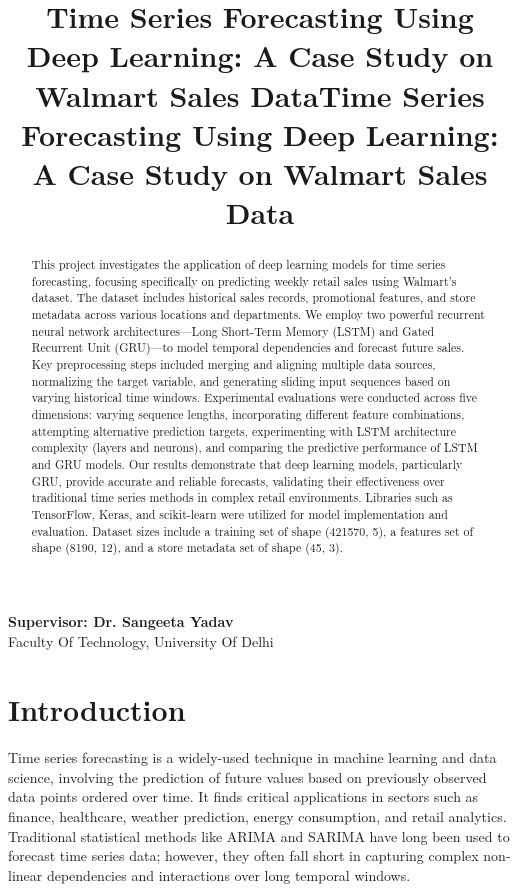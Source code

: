 \documentclass[conference]{IEEEtran}
\title{Time Series Forecasting Using Deep Learning: A Case Study on Walmart Sales Data}
\author{
\IEEEauthorblockN{
Tamanna Sharma,
Jenny Prasad,
Ashish Pal,
Piyush Takrani,
Khushdeep Singh,
Arham Khan}
}
\begin{document}
\maketitle  %

\vspace{1.5em}
\begin{center}
\textbf{Supervisor: Dr. Sangeeta Yadav}\\
Faculty Of Technology, University Of Delhi\\
\end{center}
\vspace{1em}

\title{Time Series Forecasting Using Deep Learning: A Case Study on Walmart Sales Data}





\begin{abstract}
This project investigates the application of deep learning models for time series forecasting, focusing specifically on predicting weekly retail sales using Walmart's dataset. The dataset includes historical sales records, promotional features, and store metadata across various locations and departments. We employ two powerful recurrent neural network architectures—Long Short-Term Memory (LSTM) and Gated Recurrent Unit (GRU)—to model temporal dependencies and forecast future sales. Key preprocessing steps included merging and aligning multiple data sources, normalizing the target variable, and generating sliding input sequences based on varying historical time windows. Experimental evaluations were conducted across five dimensions: varying sequence lengths, incorporating different feature combinations, attempting alternative prediction targets, experimenting with LSTM architecture complexity (layers and neurons), and comparing the predictive performance of LSTM and GRU models. Our results demonstrate that deep learning models, particularly GRU, provide accurate and reliable forecasts, validating their effectiveness over traditional time series methods in complex retail environments. Libraries such as TensorFlow, Keras, and scikit-learn were utilized for model implementation and evaluation. Dataset sizes include a training set of shape (421570, 5), a features set of shape (8190, 12), and a store metadata set of shape (45, 3).
\end{abstract}

\section{Introduction}
Time series forecasting is a widely-used technique in machine learning and data science, involving the prediction of future values based on previously observed data points ordered over time. It finds critical applications in sectors such as finance, healthcare, weather prediction, energy consumption, and retail analytics. Traditional statistical methods like ARIMA and SARIMA have long been used to forecast time series data; however, they often fall short in capturing complex non-linear dependencies and interactions over long temporal windows.
\end{document}
